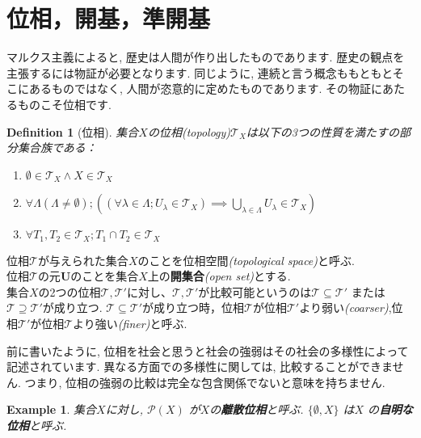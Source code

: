 \documentclass[dvipdfmx]{jbook}
\newtheorem{definition}[theorem]{Definition}
\theoremstyle{remark}
\theoremstyle{plain}
\newtheorem{example}[theorem]{Example}
\begin{document}
\section{位相，開基，準開基}

マルクス主義によると, 歴史は人間が作り出したものであります. 歴史の観点を主張するには物証が必要となります.
同じように, 連続と言う概念ももともとそこにあるものではなく, 人間が恣意的に定めたものであります. その物証にあたるものこそ位相です. 


\begin{definition}[位相]
	集合$X$の位相\textit{(topology)}$\mathcal{T}_X$は以下の3つの性質を満たすの部分集合族である：

	\begin{enumerate}
		\item $\emptyset \in \mathcal{T}_X \land X \in \mathcal{T}_X$
		\item $\forall \Lambda\left( \Lambda \neq \emptyset \right) ;\left( \left( \forall \lambda \in \Lambda; U_{\lambda} \in \mathcal{T}_X \right) \implies \bigcup_{\lambda \in \Lambda} U_{\lambda} \in \mathcal{T}_X \right) $ 
		\item $\forall T_1, T_2 \in \mathcal{T}_X; T_1\cap T_2 \in \mathcal{T}_X$
	\end{enumerate}

\end{definition}


位相$\mathcal{T}$が与えられた集合$X$のことを位相空間\textit{(topological space)}と呼ぶ.\\
位相$\mathcal{T}$の元$\mathbf{U}$のことを集合$X$上の\textbf{開集合}\textit{(open set)}とする.\\
集合$X$の2つの位相$\mathcal{T},\mathcal{T}'$に対し、$\mathcal{T},\mathcal{T}'$が比較可能というのは$\mathcal{T} \subseteq \mathcal{T}' $ または$ \mathcal{T} \supseteq \mathcal{T}'$が成り立つ.
$\mathcal{T} \subseteq \mathcal{T}'$が成り立つ時，位相$\mathcal{T}$が位相$\mathcal{T}'$より弱い\textit{(coarser)},位相$\mathcal{T}'$が位相$\mathcal{T}$より強い\textit{(finer)}と呼ぶ.

前に書いたように, 位相を社会と思うと社会の強弱はその社会の多様性によって記述されています. 異なる方面での多様性に関しては, 比較することができません. つまり, 位相の強弱の比較は完全な包含関係でないと意味を持ちません.

\begin{example}
	集合$X$に対し, $\mathcal{P}\left( X \right) $ が$X$の\textbf{離散位相}と呼ぶ. $\{\emptyset , X\} $ は$X$ の\textbf{自明な位相}と呼ぶ.
\end{example}
\end{document}
